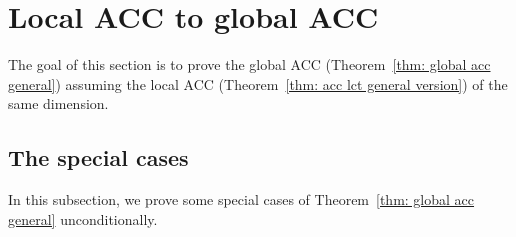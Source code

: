 \documentclass[11pt,reqno]{amsart}
\numberwithin{equation}{section}
\theoremstyle{definition}
\begin{document}
\section{Local ACC to global ACC}\label{sec: local to global}

The goal of this section is to prove the global ACC (Theorem~\ref{thm: global acc general}) assuming the local ACC (Theorem~\ref{thm: acc lct general version}) of the same dimension.

\subsection{The special cases}

In this subsection, we prove some special cases of Theorem~\ref{thm: global acc general} unconditionally.
\end{document}
